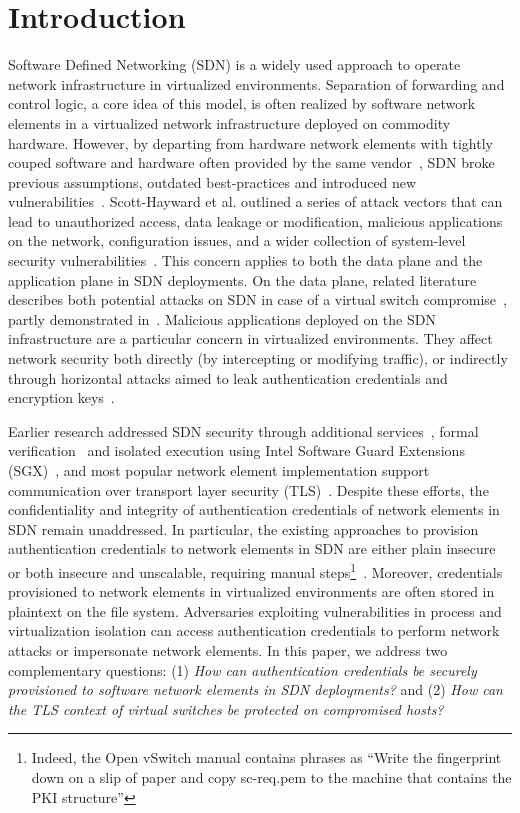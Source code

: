 {%
\section{Introduction}
\label{sec:intro}
Software Defined Networking (SDN) is a widely used approach to operate network infrastructure in virtualized environments.
Separation of forwarding and control logic, a core idea of this model, is often realized by software network elements in a virtualized network infrastructure deployed on commodity hardware.
However, by departing from hardware network elements with tightly couped software and hardware often provided by the same vendor~\cite{etsinfv:2013},
SDN broke previous assumptions, outdated best-practices and introduced new vulnerabilities~\cite{paladi:2015,paladi:2017c}.
Scott-Hayward et al. outlined a series of attack vectors that can lead to unauthorized access, data leakage or modification, malicious applications on the network, configuration issues, and a wider collection of system-level security vulnerabilities~\cite{scott:2015}.
This concern applies to both the data plane and the application plane in SDN deployments.
On the data plane, related literature describes both potential attacks on SDN in case of a virtual switch compromise~\cite{antikainen:2014}, partly demonstrated in~\cite{thimmaraju:2017}.
Malicious applications deployed on the SDN infrastructure are a particular concern in virtualized environments. 
They affect network security both directly (by intercepting or modifying traffic), or indirectly through horizontal attacks aimed to leak authentication credentials and encryption keys~\cite{itu-t:2016}.

Earlier research addressed SDN security through additional services~\cite{porras:2012,shin:2013,hu:2014}, formal verification~\cite{ball:2014} and isolated execution using Intel Software Guard Extensions (SGX)~\cite{shih:2016,paladi:2016b,kim:2017,paladi:2017b}, and most popular network element implementation support communication over transport layer security (TLS)~\cite{rfc5246}.
Despite these efforts, the confidentiality and integrity of authentication credentials of network elements in SDN remain unaddressed.
In particular, the existing approaches to provision authentication credentials to network elements in SDN are either plain insecure or both insecure and unscalable, requiring manual steps\footnote{Indeed, the Open vSwitch manual contains phrases as 
``Write the fingerprint down on a slip of paper and copy sc-req.pem to the machine that contains the PKI structure''}~\cite{ovs_ssl}.
Moreover, credentials provisioned to network elements in virtualized environments are often stored in plaintext on the file system.
Adversaries exploiting vulnerabilities in process and virtualization isolation can access authentication credentials to perform network attacks or impersonate network elements.
In this paper, we address two complementary questions:
(1) \textit{How can authentication credentials be securely provisioned to software network elements in SDN deployments?}
and 
(2) \textit{How can the TLS context of virtual switches be protected on compromised hosts?}

}
